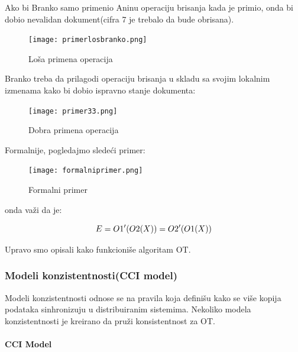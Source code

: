 \documentclass[12pt]{article}
\begin{document}
Ako bi Branko samo primenio Aninu operaciju brisanja kada je primio, onda bi dobio nevalidan dokument(cifra 7 je trebalo da bude obrisana). 

\begin{figure}[H]
	\centering
	\texttt{[image: primerlosbranko.png]}
	\caption{Loša primena operacija}
	\label{fig:nls_demo}
\end{figure}

Branko treba da prilagodi operaciju brisanja u skladu sa svojim lokalnim izmenama kako bi dobio ispravno stanje dokumenta:

\begin{figure}[H]
	\centering
	\texttt{[image: primer33.png]}
	\caption{Dobra primena operacija}
	\label{fig:nls_demo}
\end{figure}

Formalnije, pogledajmo sledeći primer:

\begin{figure}[H]
	\centering
	\texttt{[image: formalniprimer.png]}
	\caption{Formalni primer}
	\label{fig:nls_demo}
\end{figure}

onda važi da je:

\[
	\huge
	E = O1'(O2(X)) = O2'(O1(X))
\]

Upravo smo opisali kako funkcioniše algoritam OT.

\subsubsection{Modeli konzistentnosti(CCI model)}

Modeli konzistentnosti odnose se na pravila koja definišu kako se više kopija podataka sinhronizuju u distribuiranim sistemima. Nekoliko modela konzistentnosti je kreirano da pruži konsistentnost za OT.

\paragraph{CCI Model}
\end{document}
